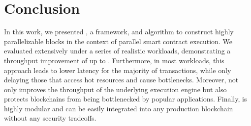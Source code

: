 
\section{Conclusion}
\label{sec:conclusion}

In this work, we presented \sys, a framework, and algorithm to construct highly parallelizable blocks in the context of parallel smart contract execution.
We evaluated \sys extensively under a series of realistic workloads, demonstrating a throughput improvement of up to \sysmax.   Furthermore, in most workloads, this approach leads to lower latency for the majority of transactions, while only delaying those that access hot resources and cause bottlenecks. %
Moreover, \sys not only improves the throughput of the underlying execution engine but also protects blockchains from being bottlenecked by popular applications.
Finally, \sys is highly modular and can be easily integrated into any production blockchain without any security tradeoffs.